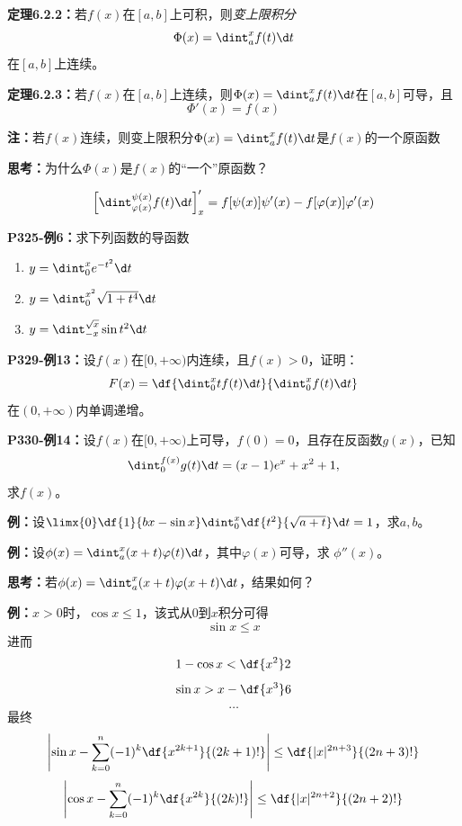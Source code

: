 {\bf 定理6.2.2：}若$f(x)$在$[a,b]$上可积，则{\it 变上限积分}
$$\Phi(x)=\dint_a^xf(t)\d t$$
在$[a,b]$上连续。

{\bf 定理6.2.3：}若$f(x)$在$[a,b]$上连续，则$\Phi(x)=\dint_a^xf(t)\d t$在$[a,b]$可导，且
$$\Phi'(x)=f(x)$$

{\bf 注：}若$f(x)$连续，则变上限积分$\Phi(x)=\dint_a^xf(t)\d t$是$f(x)$的一个原函数

{\bf 思考：}为什么$\Phi(x)$是$f(x)$的“一个”原函数？

$${\left[\dint_{\varphi(x)}^{\psi(x)}f(t)\d t\right]'_x
	=f[\psi(x)]\psi'(x)-f[\varphi(x)]\varphi'(x)}$$

{\bf P325-例6：}求下列函数的导函数
\begin{enumerate}[(1)]
  \setlength{\itemindent}{1cm}
  \item $y=\dint_0^{x}e^{-t^2}\d t$
  \item $y=\dint_0^{x^2}\sqrt{1+t^4}\d t$
  \item $y=\dint_{-x}^{\sqrt x}\sin t^2\d t$
\end{enumerate}

{\bf P329-例13：}设$f(x)$在$[0,+\infty)$内连续，且$f(x)>0$，证明：
$$F(x)=\df{\dint_0^xtf(t)\d t}{\dint_0^xf(t)\d t}$$
在$(0,+\infty)$内单调递增。

{\bf P330-例14：}设$f(x)$在$[0,+\infty)$上可导，$f(0)=0$，且存在反函数$g(x)$，已知
$$\dint_0^{f(x)}g(t)\d t=(x-1)e^x+x^2+1,$$
求$f(x)$。

{\bf 例：}设$\limx{0}\df{1}{bx-\sin
x}\dint_0^x\df{t^2}{\sqrt{a+t}}\d t=1$，求$a,b$。

{\bf 例：}设$\phi(x)=\dint_a^x(x+t)\varphi(t)\d t$，其中$\varphi(x)$可导，求
$\phi''(x)$。

{\bf 思考：}若$\phi(x)=\dint_a^x(x+t)\varphi(x+t)\d t$，结果如何？

{\bf 例：}$x>0$时，$\cos x\leq 1$，该式从$0$到$x$积分可得
$$\sin x\leq x$$
进而
$$1-\cos x<\df{x^2}2$$
$$\sin x>x-\df{x^3}6$$
$$\ldots$$
最终
$$\left|\sin x-\sum\limits_{k=0}^n(-1)^k\df{x^{2k+1}}{(2k+1)!}\right|
\leq\df{|x|^{2n+3}}{(2n+3)!}$$
$$\left|\cos x-\sum\limits_{k=0}^n(-1)^k\df{x^{2k}}{(2k)!}\right|
\leq\df{|x|^{2n+2}}{(2n+2)!}$$

